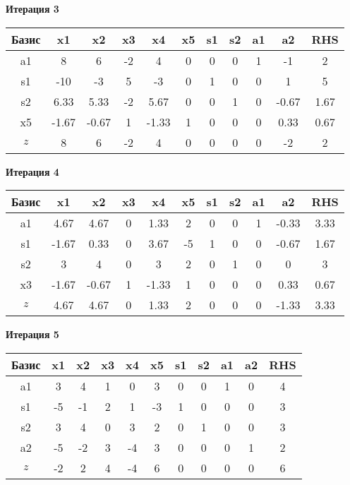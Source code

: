 \documentclass[a4paper,12pt]{article}
\begin{document}
 \textbf{Итерация 3}\\
\begin{tabular}{|c|c|c|c|c|c|c|c|c|c|c|}
\hline
Базис & x1 & x2 & x3 & x4 & x5 & s1 & s2 & a1 & a2 & RHS \\ \hline
a1 & 8 & 6 & -2 & 4 & 0 & 0 & 0 & 1 & -1 & 2 \\ \hline
s1 & -10 & -3 & 5 & -3 & 0 & 1 & 0 & 0 & 1 & 5 \\ \hline
s2 & 6.33 & 5.33 & -2 & 5.67 & 0 & 0 & 1 & 0 & -0.67 & 1.67 \\ \hline
x5 & -1.67 & -0.67 & 1 & -1.33 & 1 & 0 & 0 & 0 & 0.33 & 0.67 \\ \hline
$z$ & 8 & 6 & -2 & 4 & 0 & 0 & 0 & 0 & -2 & 2 \\ \hline
\end{tabular}
\vspace{5mm}

 \textbf{Итерация 4}\\
\begin{tabular}{|c|c|c|c|c|c|c|c|c|c|c|}
\hline
Базис & x1 & x2 & x3 & x4 & x5 & s1 & s2 & a1 & a2 & RHS \\ \hline
a1 & 4.67 & 4.67 & 0 & 1.33 & 2 & 0 & 0 & 1 & -0.33 & 3.33 \\ \hline
s1 & -1.67 & 0.33 & 0 & 3.67 & -5 & 1 & 0 & 0 & -0.67 & 1.67 \\ \hline
s2 & 3 & 4 & 0 & 3 & 2 & 0 & 1 & 0 & 0 & 3 \\ \hline
x3 & -1.67 & -0.67 & 1 & -1.33 & 1 & 0 & 0 & 0 & 0.33 & 0.67 \\ \hline
$z$ & 4.67 & 4.67 & 0 & 1.33 & 2 & 0 & 0 & 0 & -1.33 & 3.33 \\ \hline
\end{tabular}
\vspace{5mm}

 \textbf{Итерация 5}\\
\begin{tabular}{|c|c|c|c|c|c|c|c|c|c|c|}
\hline
Базис & x1 & x2 & x3 & x4 & x5 & s1 & s2 & a1 & a2 & RHS \\ \hline
a1 & 3 & 4 & 1 & 0 & 3 & 0 & 0 & 1 & 0 & 4 \\ \hline
s1 & -5 & -1 & 2 & 1 & -3 & 1 & 0 & 0 & 0 & 3 \\ \hline
s2 & 3 & 4 & 0 & 3 & 2 & 0 & 1 & 0 & 0 & 3 \\ \hline
a2 & -5 & -2 & 3 & -4 & 3 & 0 & 0 & 0 & 1 & 2 \\ \hline
$z$ & -2 & 2 & 4 & -4 & 6 & 0 & 0 & 0 & 0 & 6 \\ \hline
\end{tabular}
\vspace{5mm}
\end{document}
